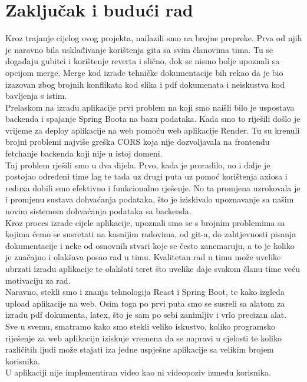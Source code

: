 \chapter{Zaključak i budući rad}
		 
		 \noindent Kroz trajanje cijelog ovog projekta, nailazili smo na brojne prepreke. Prva od njih je naravno bila usklađivanje korištenja gita sa svim članovima tima. Tu se događaju gubitci i korištenje reverta i slično, dok se nismo bolje upoznali sa opcijom merge. Merge kod izrade tehničke dokumentacije bih rekao da je bio izazovan zbog brojnih konflikata kod slika i pdf dokumenata i neiskustva kod bavljenja s istim. \\
		 
		 \noindent Prelaskom na izradu aplikacije prvi problem na koji smo naišli bilo je uspostava backenda i spajanje Spring Boota na bazu podataka. Kada smo to riješili došlo je vrijeme za deploy aplikacije na web pomoću web aplikacije Render. Tu su krenuli brojni problemi najviše greška CORS koja nije dozvoljavala na frontendu fetchanje backenda koji nije u istoj domeni.\\
		 
		 \noindent Taj problem rješili smo u dva dijela. Prvo, kada je proradilo, no i dalje je postojao određeni time lag te tada uz drugi puta uz pomoć korištenja axiosa i reduxa dobili smo efektivno i funkcionalno rješenje. No ta promjena uzrokovala je i promjenu sustava dohvaćanja podataka, što je iziskivalo upoznavanje sa našim novim sistemom dohvaćanja podataka sa backenda.\\
		 
		 \noindent Kroz proces izrade cijele aplikacije, upoznali smo se s brojnim problemima sa kojima ćemo se susretati na kasnijim radovima, od git-a, do zahtjevnosti pisanja dokumentacije i neke od osnovnih stvari koje se često zanemaruju, a to je koliko je značajno i olakšava posao rad u timu. Kvalitetan rad u timu može uvelike ubrzati izradu aplikacije te olakšati teret što uvelike daje svakom članu time veću motivaciju za rad.\\
		 
		 \noindent Naravno, stekli smo i znanja tehnologija React i Spring Boot, te kako izgleda upload aplikacije na web. Osim toga po prvi puta smo se susreli sa alatom za izradu pdf dokumenta, latex, što je sam po sebi zanimljiv i vrlo precizan alat.\\
		 
		 \noindent Sve u svemu, smatramo kako smo stekli veliko iskustvo, koliko programsko riješenje za web aplikaciju iziskuje vremena da se napravi u cjelosti te koliko različitih ljudi može stajati iza jedne uspješne aplikacije sa velikim brojem korisnika.\\
		
		 \noindent U aplikaciji nije implementiran video kao ni videopoziv između korisnika.
		
		\eject 